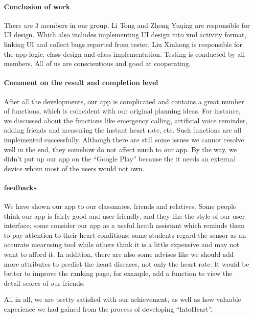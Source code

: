 \paragraph{Conclusion of work}
There are 3 members in our group. Li Tong and Zhong Yuqing are responsible for UI design. Which also includes implementing UI design into xml activity format, linking UI and collect bugs reported from tester. Liu Xinhong is responsible for the app logic, class design and class implementation. Testing is conducted by all members.  All of us are conscientious and good at cooperating. 
                                
\paragraph{Comment on the result and completion level}
After all the developments, our app is complicated and contains a great number of functions, which is coincident with our original planning ideas. For instance, we discussed about the functions like emergency calling, artificial voice reminder, adding friends and measuring the instant heart rate, etc. Such functions are all implemented successfully. Although there are still some issues we cannot resolve well in the end,  they somehow do not affect much to our app. By the way, we didn’t put up our app on the “Google Play” because the it needs an external device whom most of the users would not own.  
 
\paragraph{feedbacks}
We have shown our app to our classmates, friends and relatives. Some people think our app is fairly good and user friendly, and they like the style of our user interface; some consider our app as a useful heath assistant which reminds them to pay attention to their heart conditions; some students regard the sensor as an accurate mearusing tool while others think it is a little expensive and may not want to afford it. In addition, there are also some advises like we should add more attributes to predict the heart diseases, not only the heart rate. It would be better to improve the ranking page, for example, add a function to view the detail scores of our friends. 

All in all, we are pretty satisfied with our achievement, as well as how valuable experience we had gained from the process of developing “IntoHeart”. 